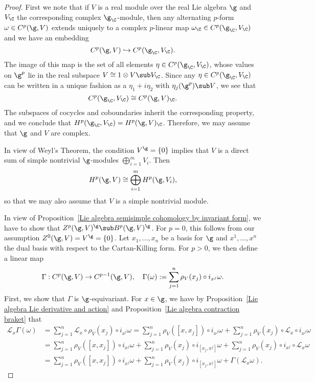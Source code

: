 \begin{proof}
First we note that if $V$ is a real module over the real Lie algebra $\g$ and $V_\C$ the corresponding complex $\g_\C$-module, then any alternating $p$-form $\omega\in C^p(\g,V)$ extends uniquely to a complex $p$-linear map $\omega_\C\in C^p(\g_\C,V_\C)$ and we have an embedding
\[C^p(\g,V)\hookrightarrow C^p(\g_\C,V_\C).\]
The image of this map is the set of all elements $\eta\in C^p(\g_{\C},V_{\C})$, whose values on $\g^p$ lie in the real subspace $V\cong 1\otimes V\sub V_\C$. Since any $\eta\in C^p(\g_{\C},V_{\C})$ can be written in a unique fashion as a $\eta_1+i\eta_2$ with $\eta_j(\g^p)\sub V$, we see that
\[C^p(\g_\C,V_\C)\cong C^p(\g,V)_\C.\]
The subspaces of cocycles and coboundaries inherit the corresponding property, and we conclude that $H^p(\g_\C,V_\C)=H^p(\g,V)_\C$. Therefore, we may assume that $\g$ and $V$ are complex.\par
In view of Weyl's Theorem, the condition $V^\g=\{0\}$ implies that $V$ is a direct sum of simple nontrivial $\g$-modules $\bigoplus_{i=1}^{m}V_i$. Then
\[H^p(\g,V)\cong\bigoplus_{i=1}^{m}H^p(\g,V_i),\]
so that we may also assume that $V$ is a simple nontrivial module.\par
In view of Proposition~\ref{Lie algebra semisimple cohomology by invariant form}, we have to show that $Z^p(\g,V)^\g\sub B^p(\g,V)^\g$. For $p=0$, this follows from our assumption $Z^0(\g,V)=V^\g=\{0\}$. Let $x_1,\dots,x_n$ be a basis for $\g$ and $x^1,\dots,x^n$ the dual basis with respect to the Cartan-Killing form. For $p>0$, we then define a linear map
\[\Gamma:C^p(\g,V)\to C^{p-1}(\g,V),\quad\Gamma(\omega):=\sum_{j=1}^{n}\rho_V(x_j)\circ i_{x^j}\omega.\]
First, we show that $\Gamma$ is $\g$-equivariant. For $x\in\g$, we have by Proposition~\ref{Lie algebra Lie derivative and action} and Proposition~\ref{Lie algebra contraction braket} that
\begin{align*}
\mathcal{L}_x\Gamma(\omega)&=\sum_{j=1}^{n}\mathcal{L}_x\circ\rho_V(x_j)\circ i_{x^j}\omega=\sum_{j=1}^{n}\rho_V([x,x_j])\circ i_{x^j}\omega+\sum_{j=1}^{n}\rho_V(x_j)\circ\mathcal{L}_x\circ i_{x^j}\omega\\
&=\sum_{j=1}^{n}\rho_V([x,x_j])\circ i_{x^j}\omega+\sum_{j=1}^{n}\rho_V(x_j)\circ i_{[x_j,x^j]}\omega+\sum_{j=1}^{n}\rho_V(x_j)\circ i_{x^j}\circ\mathcal{L}_x\omega\\
&=\sum_{j=1}^{n}\rho_V([x,x_j])\circ i_{x^j}\omega+\sum_{j=1}^{n}\rho_V(x_j)\circ i_{[x_j,x^j]}\omega+\Gamma(\mathcal{L}_x\omega).
\end{align*}

\end{proof}
